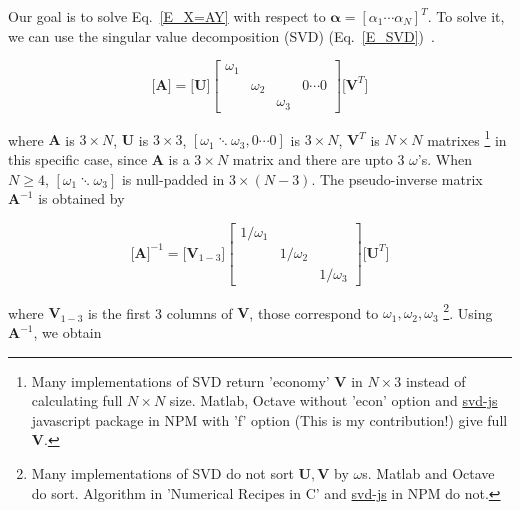 \documentclass[dvipdfmx,a4paper]{article}
\begin{document}
Our goal is to solve Eq.~\eqref{E_X=AY} with respect to $ \boldsymbol{\alpha} = [\alpha_1 \cdots \alpha_N]^T $. To solve it, we can use the singular value decomposition (SVD) (Eq.~\eqref{E_SVD})~\cite{SVD_NRC}.

\begin{equation}
  \label{E_SVD}
  \Bigg[ \boldsymbol{A} \Bigg] =
  \Bigg[ \boldsymbol{U} \Bigg]
  \left[
    \begin{array}{cccc}
      \omega_1 & \\
        & \omega_2 &   &  0 \cdots 0 \\
        &  & \omega_3 &
    \end{array}
  \right]
  \Bigg[ \boldsymbol{V}^T \Bigg]
\end{equation}

\noindent
where $ \boldsymbol{A} $ is $ 3 \times N $,
$ \boldsymbol{U} $ is $ 3 \times 3 $,
$ [\omega_1 \ddots \omega_3, 0 \cdots 0] $ is $ 3 \times N $,
$ \boldsymbol{V}^T $ is $ N \times N $ matrixes
\footnote{Many implementations of SVD return 'economy' $\boldsymbol{V}$ in $ N \times 3$ instead of calculating full $N \times N$ size. Matlab, Octave without 'econ' option and \href{https://www.npmjs.com/package/svd-js}{svd-js} javascript package in NPM with 'f' option (This is my contribution!) give full $\boldsymbol{V}$.}
in this specific case, since $ \boldsymbol{A} $ is a $ 3 \times N $ matrix and there are upto 3 $\omega$'s. When $ N \geq 4 $, $ [\omega_1 \ddots \omega_3 ] $ is null-padded in $ 3 \times (N-3) $.
The pseudo-inverse matrix $ \boldsymbol{A}^{-1} $ is obtained by

\begin{equation}
  \Bigg[ \boldsymbol{A} \Bigg]^{-1} =
  \Bigg[ \boldsymbol{V}_{1-3} \Bigg]
  \left[
    \begin{array}{ccc}
      1/\omega_1 & & \\
      & 1/\omega_2 & \\
      & & 1/\omega_3
    \end{array}
  \right]
  \Bigg[ \boldsymbol{U}^T \Bigg]
\end{equation}

\noindent
where $ \boldsymbol{V}_{1-3} $ is the first 3 columns of $ \boldsymbol{V} $, those correspond to $ \omega_1, \omega_2, \omega_3 $
\footnote{Many implementations of SVD do not sort $ \boldsymbol{U}, \boldsymbol{V}$ by $\omega$s. Matlab and Octave do sort. Algorithm in 'Numerical Recipes in C' and \href{https://www.npmjs.com/package/svd-js}{svd-js} in NPM do not.}.
Using $ \boldsymbol{A}^{-1} $, we obtain
\end{document}
